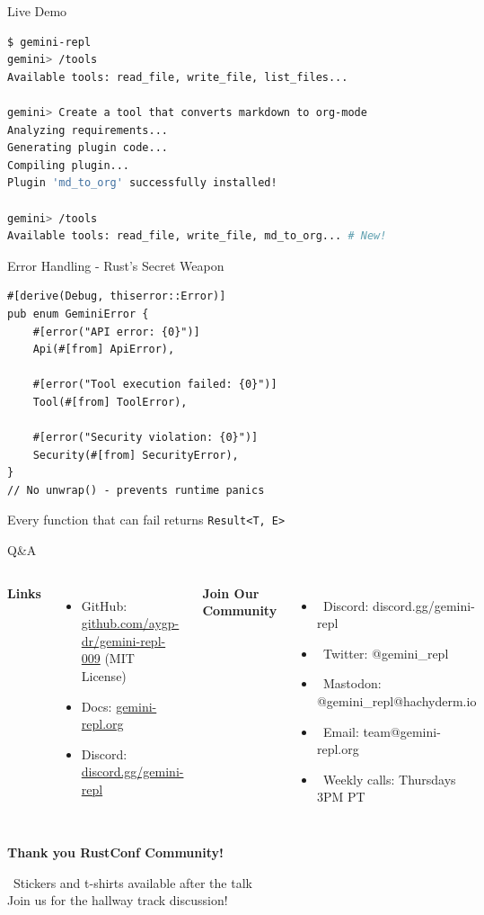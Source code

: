 \documentclass[aspectratio=169]{beamer}
\begin{document}
\begin{frame}[fragile]{Live Demo}
\begin{lstlisting}[language=bash]
$ gemini-repl
gemini> /tools
Available tools: read_file, write_file, list_files...

gemini> Create a tool that converts markdown to org-mode
Analyzing requirements...
Generating plugin code...
Compiling plugin...
Plugin 'md_to_org' successfully installed!

gemini> /tools
Available tools: read_file, write_file, md_to_org... # New!
\end{lstlisting}
\end{frame}

\begin{frame}[fragile]{Error Handling - Rust's Secret Weapon}
\begin{lstlisting}
#[derive(Debug, thiserror::Error)]
pub enum GeminiError {
    #[error("API error: {0}")]
    Api(#[from] ApiError),
    
    #[error("Tool execution failed: {0}")]
    Tool(#[from] ToolError),
    
    #[error("Security violation: {0}")]
    Security(#[from] SecurityError),
}
// No unwrap() - prevents runtime panics
\end{lstlisting}

Every function that can fail returns \texttt{Result<T, E>}
\end{frame}

\begin{frame}{Q\&A}
\begin{columns}
\textbf{Links}
\begin{itemize}
\item GitHub: \url{github.com/aygp-dr/gemini-repl-009} (MIT License)
\item Docs: \url{gemini-repl.org}
\item Discord: \url{discord.gg/gemini-repl}
\end{itemize}

\textbf{Join Our Community}
\begin{itemize}
\item \faDiscord~Discord: discord.gg/gemini-repl
\item \faTwitter~Twitter: @gemini\_repl
\item \faMastodon~Mastodon: @gemini\_repl@hachyderm.io
\item \faEnvelope~Email: team@gemini-repl.org
\item \faCalendar~Weekly calls: Thursdays 3PM PT
\end{itemize}
\end{columns}

\begin{center}
\Large
\textbf{Thank you RustConf Community!}

\normalsize
\faGift~Stickers and t-shirts available after the talk\\Join us for the hallway track discussion!
\end{center}
\end{frame}
\end{document}
